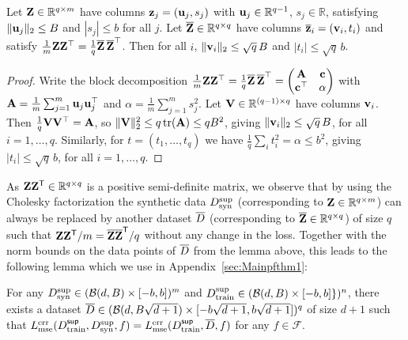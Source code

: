 \begin{lemma}
Let ${\mathbf{Z}} \in \mathbb{R}^{q \times m}$ have columns ${\mathbf{z}}_j = ({\mathbf{u}}_j, s_j)$ with ${\mathbf{u}}_j \in \mathbb{R}^{q-1}$, $s_j \in \mathbb{R}$, satisfying $\|{\mathbf{u}}_j\|_2 \le B$ and $|s_j| \le b$ for all $j$. Let $\overline{{\mathbf{Z}}} \in \mathbb{R}^{q \times q}$ have columns $\overline{{\mathbf{z}}}_i = ({\mathbf{v}}_i, t_i)$ and satisfy $\frac{1}{m} {\mathbf{Z}}{\mathbf{Z}}^\top = \frac{1}{q} \overline{{\mathbf{Z}}}\,\overline{{\mathbf{Z}}}^\top$. Then for all $i$, $\|{\mathbf{v}}_i\|_2 \le \sqrt{q}\,B$ and $|t_i| \le \sqrt{q}\,b$.
\end{lemma}
\begin{proof}
Write the block decomposition $\frac{1}{m} {\mathbf{Z}}{\mathbf{Z}}^\top = \frac{1}{q} \overline{{\mathbf{Z}}}\,\overline{{\mathbf{Z}}}^\top = \begin{pmatrix} {\mathbf{A}} & {\mathbf{c}} \\ {\mathbf{c}}^\top & \alpha \end{pmatrix}$ with ${\mathbf{A}} = \frac{1}{m}\sum_{j=1}^m {\mathbf{u}}_j {\mathbf{u}}_j^\top$ and $\alpha = \frac{1}{m}\sum_{j=1}^m s_j^2$. Let ${\mathbf{V}} \in \mathbb{R}^{(q-1)\times q}$ have columns ${\mathbf{v}}_i$. Then $\frac{1}{q} {\mathbf{V}}{\mathbf{V}}^\top = {\mathbf{A}}$, so $\|{\mathbf{V}}\|_2^2 \le q \operatorname{tr}({\mathbf{A}}) \le q B^2$, giving $\|{\mathbf{v}}_i\|_2 \le \sqrt{q}\,B$, for all $i = 1, \dots, q$. Similarly, for $t = (t_1,\dots,t_q)$ we have $\frac{1}{q}\sum_i t_i^2 = \alpha \le b^2$, giving $|t_i| \le \sqrt{q}\,b$, for all $i = 1, \dots, q$.
\end{proof}


As ${\mathbf{Z}}{\mathbf{Z}}^{\sf T} \in \mathbb{R}^{q \times q}$ is a positive semi-definite matrix, we observe that by using the Cholesky factorization the synthetic data $D_{\textnormal{syn}}^{\textnormal{sup}}$ (corresponding to ${\mathbf{Z}} \in \mathbb{R}^{q \times m}$) can always be replaced by another dataset $\overline{D}$ (corresponding to $\overline{{\mathbf{Z}}} \in \mathbb{R}^{q \times q}$) of size $q$ such that ${\mathbf{Z}}{\mathbf{Z}}^{\sf T}/m = \overline{{\mathbf{Z}}}\overline{{\mathbf{Z}}}^{\sf T}/q$ without any change in the loss. Together with the norm bounds on the data points of $\overline{D}$ from the lemma above, this leads to the following lemma which we use in Appendix~\ref{sec:Mainpfthm1}:

\begin{lemma}\label{lem:subsetreplace}
    For any $D_{\textnormal{syn}}^{\textnormal{sup}} \in (\mathcal{B}(d, B) \times [-b, b])^m$ and  $D_{\textnormal{train}}^{\textnormal{sup}} \in (\mathcal{B}(d, B) \times [-b, b]\})^n$, there exists a dataset $\overline{D}\in (\mathcal{B}(d, B\sqrt{d+1}) \times [-b\sqrt{d+1}, b\sqrt{d+1}])^q$ of size $d+1$ such that $L^{\textnormal{err}}_{\textnormal{mse}}(D^{\sf sup}_{\textnormal{train}},  D_{\textnormal{syn}}^{\textnormal{sup}}, f) = L^{\textnormal{err}}_{\textnormal{mse}}(D^{\sf sup}_{\textnormal{train}}, \overline{D}, f)$ for any $f \in \mathcal{F}$.
\end{lemma}

